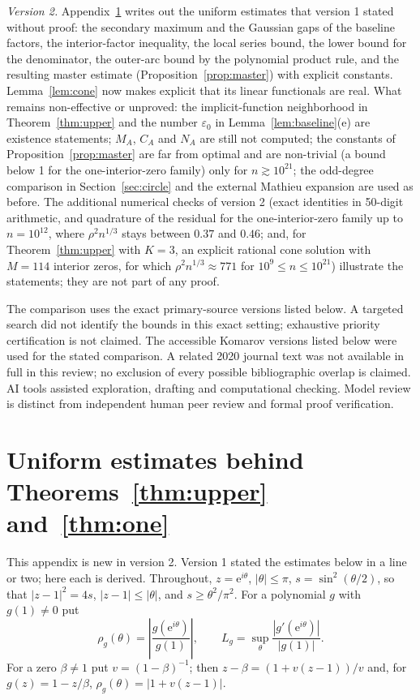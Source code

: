 \documentclass[11pt]{article}
\theoremstyle{remark}\newtheorem{remark}[theorem]{Remark}
\newcommand{\ee}{\mathrm e}
\begin{document}
\emph{Version 2.} Appendix~\ref{sec:app} writes out the uniform
estimates that version 1 stated without proof: the secondary maximum
and the Gaussian gaps of the baseline factors, the interior-factor
inequality, the local series bound, the lower bound for the
denominator, the outer-arc bound by the polynomial product rule, and
the resulting master estimate (Proposition~\ref{prop:master}) with
explicit constants. Lemma~\ref{lem:cone} now makes explicit that its
linear functionals are real. What remains non-effective or unproved:
the implicit-function neighborhood in Theorem~\ref{thm:upper} and the
number \(\varepsilon_0\) in Lemma~\ref{lem:baseline}(e) are existence
statements; \(M_A\), \(C_A\) and \(N_A\) are still not computed; the
constants of Proposition~\ref{prop:master} are far from optimal and
are non-trivial (a bound below 1 for the one-interior-zero family) only for
\(n\gtrsim10^{21}\); the
odd-degree comparison in Section~\ref{sec:circle} and the external
Mathieu expansion are used as before. The additional numerical
checks of version 2 (exact identities in 50-digit arithmetic, and
quadrature of the residual for the one-interior-zero family up to
\(n=10^{12}\), where \(\rho^2n^{1/3}\) stays between \(0.37\) and \(0.46\);
and, for Theorem~\ref{thm:upper} with \(K=3\), an explicit rational
cone solution with \(M=114\) interior zeros, for which
\(\rho^2n^{1/3}\approx771\) for \(10^9\le n\le10^{21}\)) illustrate
the statements; they are not part of any proof.

The comparison uses the exact primary-source versions listed below.
A targeted search did not identify the bounds in this exact setting;
exhaustive priority certification is not claimed. The accessible
Komarov versions listed below were used for the stated comparison.
A related 2020 journal text was not available in full in this review;
no exclusion of every possible bibliographic overlap is claimed.
AI tools assisted exploration, drafting and computational checking.
Model review is distinct from independent human peer review and
formal proof verification.


\appendix
\section{Uniform estimates behind Theorems~\ref{thm:upper} and~\ref{thm:one}}\label{sec:app}
This appendix is new in version 2. Version 1 stated the estimates
below in a line or two; here each is derived. Throughout,
\(z=\ee^{i\theta}\), \(|\theta|\le\pi\), \(s=\sin^2(\theta/2)\), so that
\(|z-1|^2=4s\), \(|z-1|\le|\theta|\), and \(s\ge\theta^2/\pi^2\).
For a polynomial \(g\) with \(g(1)\ne0\) put
\[
 \rho_g(\theta)=\left|\frac{g(\ee^{i\theta})}{g(1)}\right|,\qquad
 L_g=\sup_\theta\frac{|g'(\ee^{i\theta})|}{|g(1)|}.
\]
For a zero \(\beta\ne1\) put \(v=(1-\beta)^{-1}\); then
\(z-\beta=(1+v(z-1))/v\) and, for \(g(z)=1-z/\beta\),
\(\rho_g(\theta)=|1+v(z-1)|\).
\end{document}

